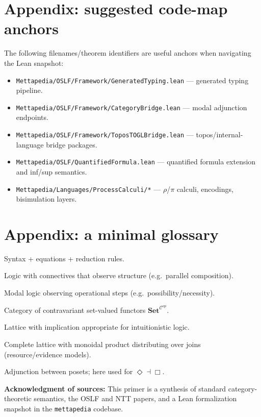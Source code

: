 \documentclass[11pt]{article}
\newcommand{\OSLF}{\textsf{OSLF}}
\newcommand{\NTT}{\textsf{NTT}}
\newcommand{\Set}{\mathbf{Set}}
\newcommand{\C}{\mathcal{C}}
\newcommand{\bx}{\Box}
\newcommand{\dia}{\Diamond}
\newcommand{\leanfile}[1]{\texttt{#1}}
\begin{document}
\appendix

\section{Appendix: suggested code-map anchors}

The following filenames/theorem identifiers are useful anchors when navigating the Lean snapshot:

\begin{itemize}
\item \leanfile{Mettapedia/OSLF/Framework/GeneratedTyping.lean} --- generated typing pipeline.
\item \leanfile{Mettapedia/OSLF/Framework/CategoryBridge.lean} --- modal adjunction endpoints.
\item \leanfile{Mettapedia/OSLF/Framework/ToposTOGLBridge.lean} --- topos/internal-language bridge packages.
\item \leanfile{Mettapedia/OSLF/QuantifiedFormula.lean} --- quantified formula extension and inf/sup semantics.
\item \leanfile{Mettapedia/Languages/ProcessCalculi/*} --- \(\rho\)/\(\pi\) calculi, encodings, bisimulation layers.
\end{itemize}

\section{Appendix: a minimal glossary}

\begin{description}[leftmargin=!,labelwidth=3.0cm]
\item[Rewrite system] Syntax + equations + reduction rules.
\item[Spatial logic] Logic with connectives that observe structure (e.g.\ parallel composition).
\item[Behavioral logic] Modal logic observing operational steps (e.g.\ possibility/necessity).
\item[Presheaf topos] Category of contravariant set-valued functors \(\Set^{\C^{op}}\).
\item[Heyting algebra] Lattice with implication appropriate for intuitionistic logic.
\item[Quantale] Complete lattice with monoidal product distributing over joins (resource/evidence models).
\item[Galois connection] Adjunction between posets; here used for \(\dia \dashv \bx\).
\end{description}

\vspace{1em}
\noindent\textbf{Acknowledgment of sources:} This primer is a synthesis of standard category-theoretic semantics,
the \OSLF{} and \NTT{} papers, and a Lean formalization snapshot in the \texttt{mettapedia} codebase.
\end{document}
